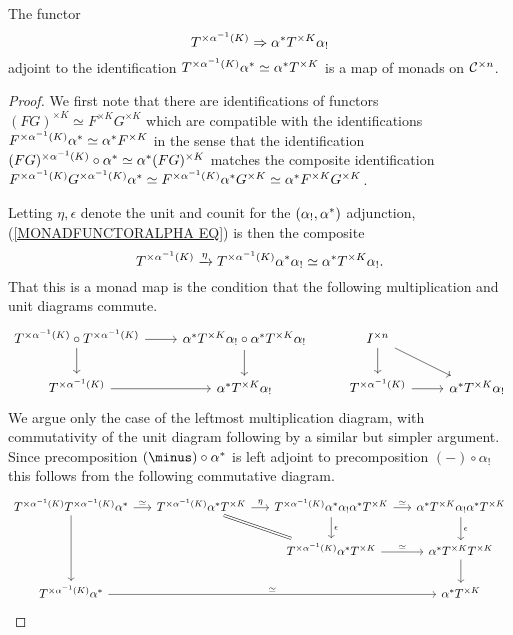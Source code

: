 \documentclass[a4paper,10pt]{article}%
\begin{document}
\begin{proposition}\label{MONADICFUN PROP}
	The functor
\begin{equation}\label{MONADFUNCTORALPHA EQ}
	T^{\times \alpha^{-1} (K)} \Rightarrow \alpha^{\**} T^{\times K} \alpha_{!}
\end{equation}
adjoint to the identification 
$T^{\times \alpha^{-1} (K)} \alpha^{\**} \simeq \alpha^{\**} T^{\times K}$
is a map of monads on $\mathcal{C}^{\times n}$.
\end{proposition}


\begin{proof}
We first note that there are identifications of functors
$(FG)^{\times K} \simeq F^{\times K} G^{\times K}$ which are compatible with the identifications
$F^{\times \alpha^{-1} (K)} \alpha^{\**} \simeq \alpha^{\**} F^{\times K}$
in the sense that the identification
$(F G)^{\times \alpha^{-1} (K)} \circ \alpha^{\**} \simeq 
\alpha^{\**} (FG)^{\times K}$
matches the composite identification
$F^{\times \alpha^{-1} (K)} G^{\times \alpha^{-1} (K)} \alpha^{\**} \simeq
F^{\times \alpha^{-1} (K)}\alpha^{\**}G^{\times K} \simeq
\alpha^{\**} F^{\times K} G^{\times K}$.

Letting $\eta, \epsilon$ denote the unit and counit for the 
$(\alpha_{!},\alpha^{\**})$ adjunction, 
(\ref{MONADFUNCTORALPHA EQ})
is then the composite
\[
	T^{\times \alpha^{-1} (K)} \xrightarrow{\eta} 
	T^{\times \alpha^{-1} (K)} \alpha^{\**} \alpha_{!} \simeq
	\alpha^{\**} T^{\times K}\alpha_{!}.
\]
That this is a monad map is the condition that the following multiplication and unit diagrams commute.
\[
\begin{tikzcd}
	T^{\times \alpha^{-1} (K)} \circ T^{\times \alpha^{-1} (K)} \ar{d} \ar{r} &
	\alpha^{\**} T^{\times K} \alpha_{!} \circ 
	\alpha^{\**} T^{\times K} \alpha_{!} \ar{d} &
	I^{\times n} \ar{d} \ar{rd}& 	
\\
	T^{\times \alpha^{-1} (K)} \ar{r} &
	\alpha^{\**} T^{\times K} \alpha_{!} &
	T^{\times \alpha^{-1} (K)} \ar{r} &
	\alpha^{\**} T^{\times K} \alpha_{!}
\end{tikzcd}
\]
We argue only the case of the leftmost multiplication diagram, with commutativity of the unit diagram following by a similar but simpler argument. Since precomposition
$(\minus) \circ \alpha^{\**}$
is left adjoint to precomposition
$(\minus) \circ \alpha_{!}$
this follows from the following commutative diagram.
\[
\begin{tikzcd}[column sep=1.5em]
	T^{\times \alpha^{-1} (K)}  T^{\times \alpha^{-1} (K)}  \alpha^{*} \ar{r}{\simeq} \ar{dd}&
	T^{\times \alpha^{-1} (K)}  \alpha^{*}  T^{\times K} \ar{r}{\eta}
	\ar[equal]{rd} &
	T^{\times \alpha^{-1} (K)} \alpha^{\**} \alpha_{!} \alpha^{*} T^{\times K} \ar{d}{\epsilon} \ar{r}{\simeq}&
	\alpha^{\**} T^{\times K} \alpha_{!} \alpha^{\**}  T^{\times K} \ar{d}{\epsilon}
\\
	& &
	T^{\times \alpha^{-1} (K)}  \alpha^{*}  T^{\times K} \ar{r}{\simeq} &
	\alpha^{*}  T^{\times K}  T^{\times K} \ar{d}
\\
	T^{\times \alpha^{-1} (K)}  \alpha^{*} \ar{rrr}{\simeq} &&&
	\alpha^{*} T^{\times K}
\end{tikzcd}
\]
\end{proof}
\end{document}
